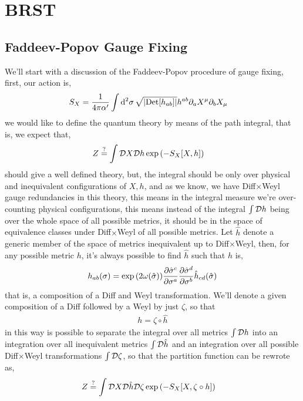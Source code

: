 \section{BRST}
\subsection{Faddeev-Popov Gauge Fixing}

We'll start with a discussion of the Faddeev-Popov procedure of gauge fixing, first, our action is,
\begin{align*}
    S_{X}&=\frac{1}{4\pi\alpha'}\int\dd[2]{\sigma}\sqrt{\abs{\textup{Det} \qty[h_{ab}]}}h^{ab}\partial_a X^\mu\partial_b X_\mu
\end{align*}
we would like to define the quantum theory by means of the path integral, that is, we expect that,
\begin{align*}
    Z&\stackrel{?}{=}\int\mathcal D X\mathcal D h\exp\qty(-S_X\qty[X,h])
\end{align*}
should give a well defined theory, but, the integral should be only over physical and inequivalent configurations of 
$X,h$, and as we know, we have Diff$\times$Weyl gauge redundancies in this theory, this means in the integral measure we're 
over-counting physical configurations, this means instead of the integral $\int\mathcal D h$ being over the whole space of all possible 
metrics, it should be in the space of equivalence classes under Diff$\times$Weyl of all possible metrics. Let $\hat h$ denote a generic 
member of the space of metrics inequivalent up to Diff$\times$Weyl, then, for any possible metric $h$, it's always possible to find $\hat h$ 
such that $h$ is,
\begin{align*}
    h_{ab}\qty(\sigma)=\exp\qty(2\omega\qty(\hat\sigma))\pdv{\hat \sigma^c}{\sigma^a}\pdv{\hat \sigma^d}{\sigma^b}\hat h_{cd}\qty(\hat \sigma)
\end{align*}
that is, a composition of a Diff and Weyl transformation. We'll denote a given composition of a Diff followed by a Weyl by just $\zeta$, so that 
\begin{align*}
    h=\zeta\circ \hat h
\end{align*}
in this way is possible to separate the integral over all metrics $\int\mathcal D h$ into an integration over all inequivalent metrics $\int\mathcal D \hat h$ 
and an integration over all possible Diff$\times$Weyl transformations $\int\mathcal D \zeta$, so that the partition function can be rewrote as,
\begin{align*}
    Z&\stackrel{?}{=}\int\mathcal D X\mathcal D \hat h\mathcal D \zeta\exp\qty(-S_X\qty[X,\zeta\circ h])
\end{align*}

